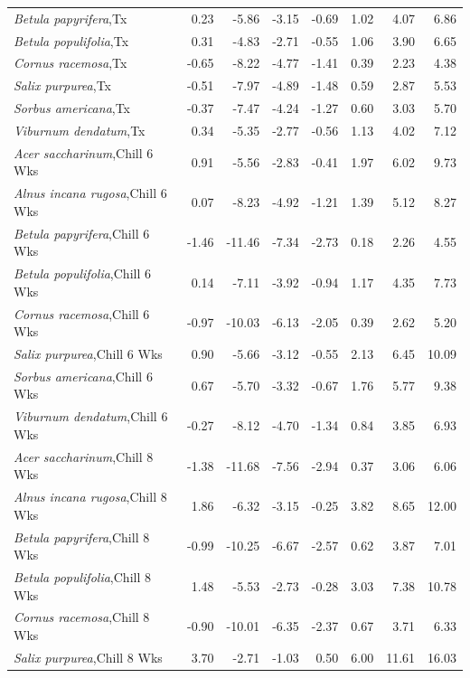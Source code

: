 \documentclass{article}\usepackage[]{graphicx}\usepackage[]{color}
\begin{document}
\begin{longtable}{lrrrrrrr}
  \textit{Betula papyrifera},Tx & 0.23 & -5.86 & -3.15 & -0.69 & 1.02 & 4.07 & 6.86 \\ 
  \textit{Betula populifolia},Tx & 0.31 & -4.83 & -2.71 & -0.55 & 1.06 & 3.90 & 6.65 \\ 
  \textit{Cornus racemosa},Tx & -0.65 & -8.22 & -4.77 & -1.41 & 0.39 & 2.23 & 4.38 \\ 
  \textit{Salix purpurea},Tx & -0.51 & -7.97 & -4.89 & -1.48 & 0.59 & 2.87 & 5.53 \\ 
  \textit{Sorbus americana},Tx & -0.37 & -7.47 & -4.24 & -1.27 & 0.60 & 3.03 & 5.70 \\ 
  \textit{Viburnum dendatum},Tx & 0.34 & -5.35 & -2.77 & -0.56 & 1.13 & 4.02 & 7.12 \\ 
  \textit{Acer saccharinum},Chill 6 Wks & 0.91 & -5.56 & -2.83 & -0.41 & 1.97 & 6.02 & 9.73 \\ 
  \textit{Alnus incana rugosa},Chill 6 Wks & 0.07 & -8.23 & -4.92 & -1.21 & 1.39 & 5.12 & 8.27 \\ 
  \textit{Betula papyrifera},Chill 6 Wks & -1.46 & -11.46 & -7.34 & -2.73 & 0.18 & 2.26 & 4.55 \\ 
  \textit{Betula populifolia},Chill 6 Wks & 0.14 & -7.11 & -3.92 & -0.94 & 1.17 & 4.35 & 7.73 \\ 
  \textit{Cornus racemosa},Chill 6 Wks & -0.97 & -10.03 & -6.13 & -2.05 & 0.39 & 2.62 & 5.20 \\ 
  \textit{Salix purpurea},Chill 6 Wks & 0.90 & -5.66 & -3.12 & -0.55 & 2.13 & 6.45 & 10.09 \\ 
  \textit{Sorbus americana},Chill 6 Wks & 0.67 & -5.70 & -3.32 & -0.67 & 1.76 & 5.77 & 9.38 \\ 
  \textit{Viburnum dendatum},Chill 6 Wks & -0.27 & -8.12 & -4.70 & -1.34 & 0.84 & 3.85 & 6.93 \\ 
  \textit{Acer saccharinum},Chill 8 Wks & -1.38 & -11.68 & -7.56 & -2.94 & 0.37 & 3.06 & 6.06 \\ 
  \textit{Alnus incana rugosa},Chill 8 Wks & 1.86 & -6.32 & -3.15 & -0.25 & 3.82 & 8.65 & 12.00 \\ 
  \textit{Betula papyrifera},Chill 8 Wks & -0.99 & -10.25 & -6.67 & -2.57 & 0.62 & 3.87 & 7.01 \\ 
  \textit{Betula populifolia},Chill 8 Wks & 1.48 & -5.53 & -2.73 & -0.28 & 3.03 & 7.38 & 10.78 \\ 
  \textit{Cornus racemosa},Chill 8 Wks & -0.90 & -10.01 & -6.35 & -2.37 & 0.67 & 3.71 & 6.33 \\ 
  \textit{Salix purpurea},Chill 8 Wks & 3.70 & -2.71 & -1.03 & 0.50 & 6.00 & 11.61 & 16.03 \\ 

\end{longtable}
\end{document}

